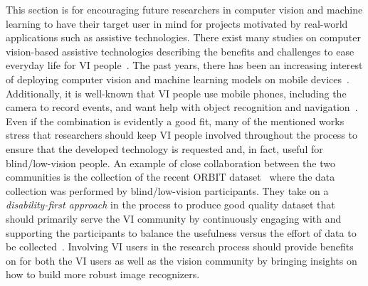 This section is for encouraging future researchers in computer vision and machine learning to have their target user in mind for projects motivated by real-world applications such as assistive technologies.
There exist many studies on computer vision-based assistive technologies describing the benefits and challenges to ease everyday life for VI people~\cite{jayant2011supporting, tian2013toward, terven2013new, leo2017computer, tapu2020wearable, wang2019implications}.  
The past years, there has been an increasing interest of deploying computer vision and machine learning models on mobile devices~\cite{zhang2019deep, lim2020federated}. Additionally, it is well-known that VI people use mobile phones, including the camera to record events, and want help with object recognition and navigation~\cite{jayant2011supporting, vazquez2012helping, szpiro2016finding, gurari2018vizwiz}. 
Even if the combination is evidently a good fit, many of the mentioned works stress that researchers should keep VI people involved throughout the process to ensure that the developed technology is requested and, in fact, useful for blind/low-vision people. 
An example of close collaboration between the two communities is the collection of the recent ORBIT dataset~\cite{massiceti2021orbit, theodorou2021disability} where the data collection was performed by blind/low-vision participants. They take on a \textit{disability-first approach} in the process to produce good quality dataset that should primarily serve the VI community by continuously engaging with and supporting the participants to balance the usefulness versus the effort of data to be collected~\cite{theodorou2021disability}. Involving VI users in the research process should provide benefits on for both the VI users as well as the vision community by bringing insights on how to build more robust image recognizers. 

